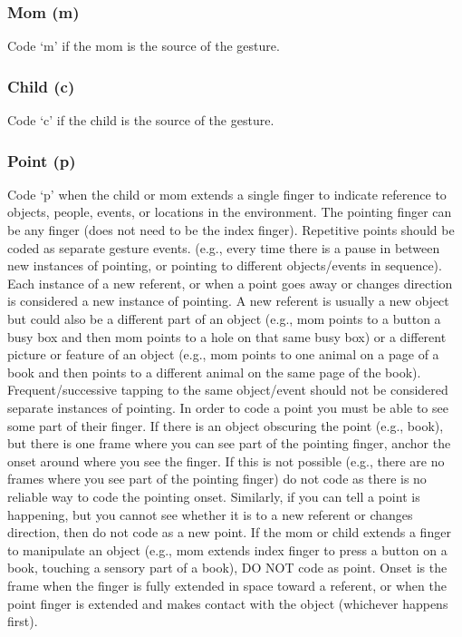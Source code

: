 \documentclass[
]{book}
\begin{document}
\hypertarget{mom}{%
\subsubsection*{Mom (m)}\label{mom}}

Code `m' if the mom is the source of the gesture.

\hypertarget{child}{%
\subsubsection*{Child (c)}\label{child}}

Code `c' if the child is the source of the gesture.

\hypertarget{point}{%
\subsubsection*{Point (p)}\label{point}}

Code `p' when the child or mom extends a single finger to indicate reference to objects, people, events, or locations in the environment. The pointing finger can be any finger (does not need to be the index finger).
Repetitive points should be coded as separate gesture events. (e.g., every time there is a pause in between new instances of pointing, or pointing to different objects/events in sequence). Each instance of a new referent, or when a point goes away or changes direction is considered a new instance of pointing. A new referent is usually a new object but could also be a different part of an object (e.g., mom points to a button a busy box and then mom points to a hole on that same busy box) or a different picture or feature of an object (e.g., mom points to one animal on a page of a book and then points to a different animal on the same page of the book). Frequent/successive tapping to the same object/event should not be considered separate instances of pointing.
In order to code a point you must be able to see some part of their finger. If there is an object obscuring the point (e.g., book), but there is one frame where you can see part of the pointing finger, anchor the onset around where you see the finger. If this is not possible (e.g., there are no frames where you see part of the pointing finger) do not code as there is no reliable way to code the pointing onset. Similarly, if you can tell a point is happening, but you cannot see whether it is to a new referent or changes direction, then do not code as a new point.
If the mom or child extends a finger to manipulate an object (e.g., mom extends index finger to press a button on a book, touching a sensory part of a book), DO NOT code as point.
Onset is the frame when the finger is fully extended in space toward a referent, or when the point finger is extended and makes contact with the object (whichever happens first).
\end{document}
